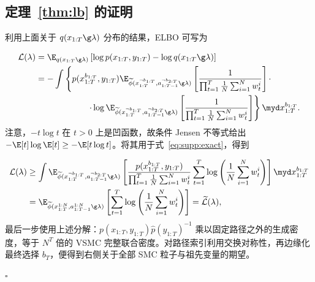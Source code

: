 \subsection{定理~\ref{thm:lb} 的证明}\label{sec:pf:lb}
利用上面关于 $q(x_{1:T}\g\lambda)$ 分布的结果，ELBO 可写为

\begin{align}
\mathcal{L}(\lambda) &= \E_{q(x_{1:T}\g\lambda)}\left[\log 
p(x_{1:T},y_{1:T}) -\log q(x_{1:T}\g\lambda)\right] 
\nonumber \\
&= -\int \left\{p(x_{1:T}^{b_{1:T}},y_{1:T}) 
\E_{\widetilde\phi(x_{1:T}^{\neg b_{1:T}},a_{1:T-1}^{\neg b_{2:T}} \g\lambda)}
\left[ \frac{1}{
\prod_{t=1}^T \frac{1}{N} \sum_{i=1}^N w_t^i }\right] \cdot \nonumber \right.\\
&\left.\qquad\qquad\qquad\cdot 
\log  
\E_{\widetilde\phi(x_{1:T}^{\neg b_{1:T}},a_{1:T-1}^{\neg b_{2:T}} \g\lambda)}
\left[ \frac{1}{
\prod_{t=1}^T \frac{1}{N} \sum_{i=1}^N w_t^i }\right] \right\}
\myd x_{1:T}^{b_{1:T}}.
\label{eq:supp:exact}
\end{align}
注意，$-t\log t$ 在 $t>0$ 上是凹函数，故条件 Jensen 不等式给出 $-\E[t]\log\E[t]\geq-\E[t\log t]$。将其用于式~\eqref{eq:supp:exact}，得到

\begin{align*}
\mathcal{L}(\lambda) &\geq \int 
\E_{\widetilde\phi(x_{1:T}^{\neg b_{1:T}},a_{1:T-1}^{\neg b_{2:T}} \g\lambda)}
\left[ \frac{p(x_{1:T}^{b_{1:T}},y_{1:T})}{
\prod_{t=1}^T \frac{1}{N} \sum_{i=1}^N w_t^i }
  \sum_{t=1}^T \log 
\left(\frac{1}{N}\sum_{i=1}^N w_t^i\right)\right]\myd 
x_{1:T}^{b_{1:T}} \nonumber\\
&= \E_{\widetilde\phi(x_{1:T}^{1:N},a_{1:T-1}^{1:N}\g\lambda)}\left[\sum_{t=1}^T \log 
\left(\frac{1}{N}\sum_{i=1}^N w_t^i\right)\right] = 
\widetilde{\mathcal{L}}(\lambda),
\end{align*}
最后一步使用上述分解：$p(x_{1:T},y_{1:T})\widehat p(y_{1:T})^{-1}$ 乘以固定路径之外的生成密度，等于 $N^T$ 倍的 VSMC 完整联合密度。对路径索引利用交换对称性，再边缘化最终选择 $b_T$，便得到右侧关于全部 SMC 粒子与祖先变量的期望。

\hfill$\square$


